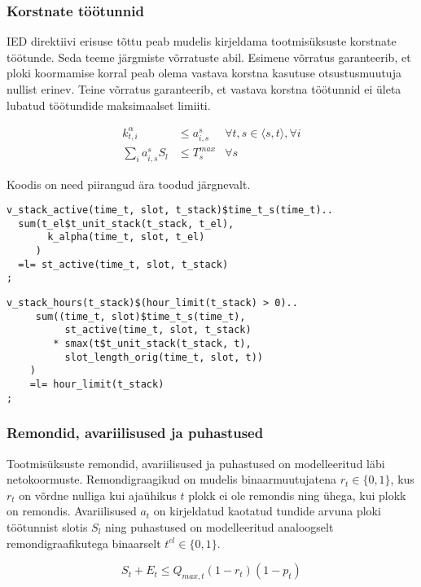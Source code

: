 \documentclass[10pt,a4paper]{article}
\begin{document}
\subsubsection{Korstnate töötunnid}
IED direktiivi erisuse tõttu peab mudelis kirjeldama tootmisüksuste korstnate töötunde. Seda teeme järgmiste võrratuste abil. Esimene võrratus garanteerib, et ploki koormamise korral peab olema vastava  korstna kasutuse otsustusmuutuja nullist erinev. Teine võrratus garanteerib, et vastava korstna töötunnid ei ületa lubatud töötundide maksimaalset limiiti.

\begin{align}
k^\alpha_{t,i} & \leq a^{s}_{i, s} & \forall t,s \in \langle s, t \rangle, \forall i \\
\sum_{i} a^{s}_{i, s} S_l  &\leq T^{max}_{s} & \forall s 
\end{align}

Koodis on need piirangud ära toodud järgnevalt.

\begin{verbatim}
v_stack_active(time_t, slot, t_stack)$time_t_s(time_t)..
  sum(t_el$t_unit_stack(t_stack, t_el),
       k_alpha(time_t, slot, t_el)
     )
  =l= st_active(time_t, slot, t_stack)
;
\end{verbatim}

\begin{verbatim}
v_stack_hours(t_stack)$(hour_limit(t_stack) > 0)..
     sum((time_t, slot)$time_t_s(time_t),
          st_active(time_t, slot, t_stack)
        * smax(t$t_unit_stack(t_stack, t), 
          slot_length_orig(time_t, slot, t))
    )
    =l= hour_limit(t_stack)
;
\end{verbatim}

\subsubsection{Remondid, avariilisused ja puhastused}
Tootmisüksuste remondid, avariilisused ja puhastused on modelleeritud läbi netokoormuste. Remondigraagikud on mudelis binaarmuutujatena $r_t \in \{0,1\}$, kus $r_t$ on võrdne nulliga kui ajaühikus $t$ plokk ei ole remondis ning ühega, kui plokk on remondis. Avariilisused $a_t$ on kirjeldatud kaotatud tundide arvuna ploki töötunnist slotis $S_l$ ning puhastused on modelleeritud analoogselt remondigraafikutega binaarselt $t^{cl} \in \{0,1\}$. 

\begin{equation}
S_t + E_t \leq Q_{max,t}(1 - r_t)(1-p_t)
\end{equation}
\end{document}
